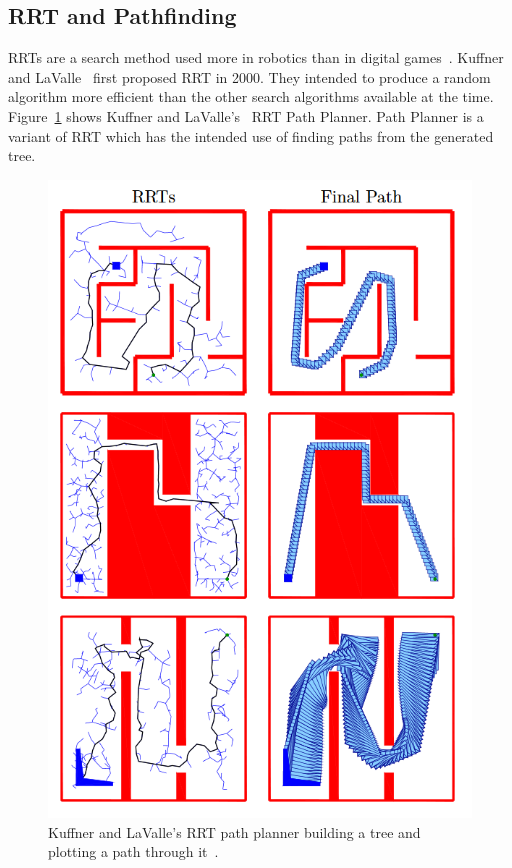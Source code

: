 \documentclass[journal]{IEEEtran}
\begin{document}
\subsection{RRT and Pathfinding} \label{RRTadnPathfinding}
RRTs are a search method used more in robotics than in digital games~\cite{LaValle1998,Kuffner2000}. Kuffner and LaValle~\cite{Kuffner2000} first proposed RRT in 2000. They intended to produce a random algorithm more efficient than the other search algorithms available at the time.  Figure~\ref{KuffnerRRT} shows Kuffner and LaValle's~\cite{Kuffner2000} RRT Path Planner. Path Planner is a variant of RRT which has the intended use of finding paths from the generated tree.
\begin{figure}[h]
	\includegraphics[width=1.0\linewidth]{KuffnerRRT.png}
	\caption{ Kuffner and LaValle's RRT path planner building a tree and plotting a path through it~\cite{Kuffner2000}.}
	\label{KuffnerRRT}
\end{figure} 
\end{document}
